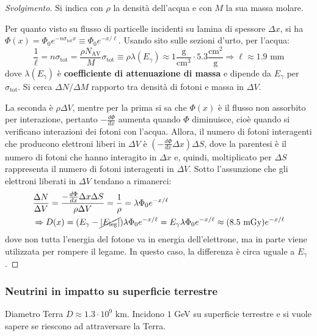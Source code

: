 \documentclass[10pt, a4paper]{scrartcl}
\numberwithin{equation}{subsection}
\theoremstyle{style1}
\renewcommand\qedsymbol{$\blacksquare$}
\newenvironment{svolgimento}{\renewcommand\qedsymbol{$\spadesuit$}\begin{proof}[Svolgimento]}{\end{proof}}
\begin{document}
\begin{svolgimento}
	Si indica con $\rho $ la densit\`a dell'acqua e con $M$ la sua massa molare.

	Per quanto visto su flusso di particelle incidenti su lamina di spessore $\Delta x$, si ha $\Phi(x) = \Phi_0 e^{- n \sigma _\text{tot} x } \equiv \Phi_0 e^{- x / \ell } $. Usando sito sulle sezioni d'urto, per l'acqua:
	\[
	\frac{1}{\ell } = n \sigma _\text{tot} = \frac{\rho N_\text{AV} }{M}\sigma _\text{tot}\equiv \rho \lambda(E_\gamma) \approx 1 \frac{\text{g}}{\text{cm}^3} \cdot 5.3 \frac{\text{cm}^2}{\text{g}}\Rightarrow \ell \approx 1.9 \text{ mm}
	\] 
dove $\lambda(E_\gamma) $ \`e \textbf{coefficiente di attenuazione di massa} e dipende da $E_\gamma$ per $\sigma _\text{tot}$. Si cerca $\Delta N / \Delta M$ rapporto tra densit\`a di fotoni e massa in $\Delta V$.

La seconda \`e $\rho \Delta V$, mentre per la prima si sa che $\Phi(x)$ \`e il flusso non assorbito per interazione, pertanto $-\frac{d \Phi}{d x} $ aumenta quando $\Phi$ diminuisce, cio\`e quando si verificano interazioni dei fotoni con l'acqua. Allora, il numero di fotoni interagenti che producono elettroni liberi in $\Delta V$ \`e $(-\frac{d \Phi}{d x} \Delta x) \Delta S$, dove la parentesi \`e il numero di fotoni che hanno interagito in $\Delta x$ e, quindi, moltiplicato per $\Delta S$ rappresenta il numero di fotoni interagenti in $\Delta V$. Sotto l'assunzione che gli elettroni liberati in $\Delta V$ tendano a rimanerci:
\begin{equation*}
	\begin{split}
		&\frac{\Delta N}{\Delta V} = \frac{-\frac{d \Phi}{d x} \Delta x \Delta S}{\rho \Delta V} = \frac{1}{\rho } = \lambda \Phi_0 e^{- x / \ell } \\
		&\Rightarrow D(x) = (E_\gamma - \cancel{|E_\text{leg}|}) \lambda \Phi_0 e^{-x / \ell }  = E_\gamma \lambda \Phi _0 e^{- x / \ell }  \approx (8.5 \text{ mGy}) e^{-x / \ell } 
	\end{split}
\end{equation*}
dove non tutta l'energia del fotone va in energia dell'elettrone, ma in parte viene utilizzata per rompere il legame. In questo caso, la differenza \`e circa uguale a $E_\gamma$.
\end{svolgimento}
\subsubsection{Neutrini in impatto su superficie terrestre}
Diametro Terra $D\approx 1.3 \cdot 10^9 \text{ km}$. Incidono $1$ GeV su superficie terrestre e si vuole sapere se riescono ad attraversare la Terra.
\end{document}

